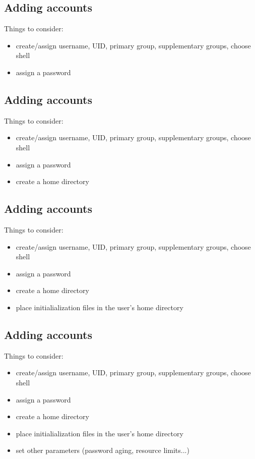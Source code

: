 \documentclass[xga]{xdvislides}
\begin{document}
\subsection{Adding accounts}
Things to consider:
\begin{itemize}
	\item create/assign username, UID, primary group, supplementary groups,
		choose shell
	\item assign a password
\end{itemize}

\subsection{Adding accounts}
Things to consider:
\begin{itemize}
	\item create/assign username, UID, primary group, supplementary groups,
		choose shell
	\item assign a password
	\item create a home directory
\end{itemize}

\subsection{Adding accounts}
Things to consider:
\begin{itemize}
	\item create/assign username, UID, primary group, supplementary groups,
		choose shell
	\item assign a password
	\item create a home directory
	\item place initialialization files in the user's home directory
\end{itemize}

\subsection{Adding accounts}
Things to consider:
\begin{itemize}
	\item create/assign username, UID, primary group, supplementary groups,
		choose shell
	\item assign a password
	\item create a home directory
	\item place initialialization files in the user's home directory
	\item set other parameters (password aging, resource limits...)
\end{itemize}
\end{document}

